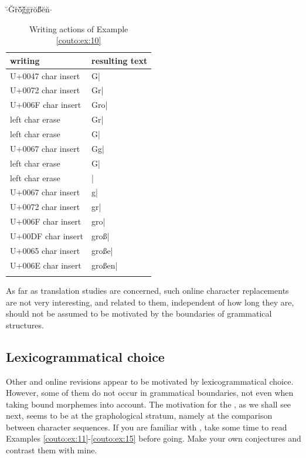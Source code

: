 \documentclass[output=paper]{LSP/langsci}
\begin{document}
\begin{exe}%
	\ex\label{couto:ex:10}$\cdot$\u{ }G\u{ }r\u{ }o\={ }\uettl\u{ }\uettl\u{ }g\u{ }\uettl\u{ }\uettl\u{ }g\u{ }r\={ }o\u{ }ß\u{ }e\u{ }n\u{ }$\cdot$
\end{exe}

\begin{table}%
	\centering
	\begin{tabularx}{\textwidth}{XX}
		\lsptoprule
		writing & resulting text \\
		\midrule
		U+0047 char insert & G| \\
		\hline
		U+0072 char insert & Gr| \\
		\hline
		U+006F char insert & Gro| \\
		\hline
		\hline
		left char erase & Gr| \\
		\hline
		left char erase & G| \\
		\hline
		U+0067 char insert & Gg| \\
		\hline
		left char erase & G| \\
		\hline
		left char erase & | \\
		\hline
		U+0067 char insert & g| \\
		\hline
		U+0072 char insert & gr| \\
		\hline
		\hline
		U+006F char insert & gro| \\
		\hline
		U+00DF char insert & groß| \\
		\hline
		U+0065 char insert & große| \\
		\hline
		U+006E char insert & großen| \\
		\lspbottomrule
	\end{tabularx}
	\caption{Writing actions of Example \ref{couto:ex:10}}
	\label{couto:tab:4}
\end{table}

As far as translation studies are concerned, such online character replacements are not very interesting, and  related to them, independent of how long they are, should not be assumed to be motivated by the boundaries of grammatical structures.

\subsection{Lexicogrammatical choice}
\label{couto:sec:LexicogrammaticalChoice}

Other  and online revisions appear to be motivated by lexicogrammatical choice. However, some of them do not occur in grammatical boundaries, not even when taking bound morphemes into account. The motivation for the , as we shall see next, seems to be at the graphological stratum, namely at the comparison between character sequences. If you are familiar with , take some time to read Examples \ref{couto:ex:11}-\ref{couto:ex:15} before going. Make your own conjectures and contrast them with mine.
\end{document}
